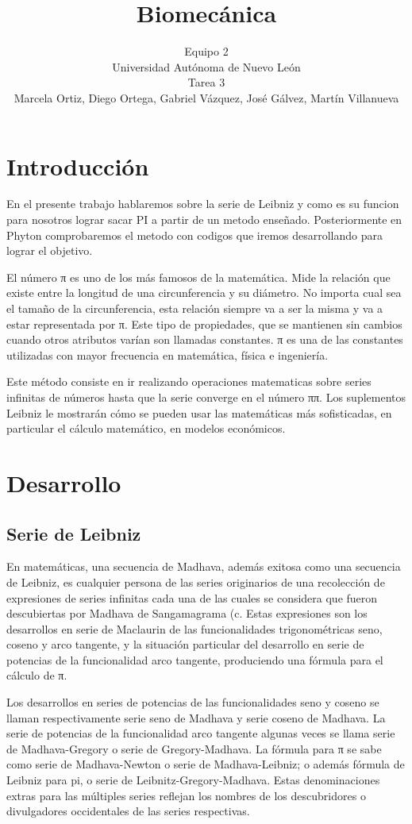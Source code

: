 \documentclass[a4paper]{article}
\title{Biomecánica}
\author{Equipo 2\\
  \small Universidad Autónoma de Nuevo León\\
  \small Tarea 3\\
  \small Marcela Ortiz, Diego Ortega, Gabriel Vázquez, José Gálvez, Martín Villanueva\\
  \date{}
}
\begin{document}
\maketitle

\section{Introducci\'on}
En el presente trabajo hablaremos sobre la serie de Leibniz y como es su funcion para nosotros lograr sacar PI a partir de un metodo enseñado.  Posteriormente en Phyton comprobaremos el metodo con codigos que iremos desarrollando para lograr el objetivo. 

El número π es uno de los más famosos de la matemática. Mide la relación que existe entre la longitud de una circunferencia y su diámetro. No importa cual sea el tamaño de la circunferencia, esta relación siempre va a ser la misma y va a estar representada por π. Este tipo de propiedades, que se mantienen sin cambios cuando otros atributos varían son llamadas constantes. π es una de las constantes utilizadas con mayor frecuencia en matemática, física e ingeniería. 

Este método consiste en ir realizando operaciones matematicas sobre series infinitas de números hasta que la serie converge en el número ππ. Los suplementos Leibniz le mostrarán cómo se pueden usar las matemáticas más sofisticadas, en particular el cálculo matemático, en modelos económicos.  

\section{Desarrollo}
\subsection{Serie de Leibniz }

En matemáticas, una secuencia de Madhava, además exitosa como una secuencia de Leibniz, es cualquier persona de las series originarios de una recolección de expresiones de series infinitas cada una de las cuales se considera que fueron descubiertas por Madhava de Sangamagrama (c. Estas expresiones son los desarrollos en serie de Maclaurin de las funcionalidades trigonométricas seno, coseno y arco tangente, y la situación particular del desarrollo en serie de potencias de la funcionalidad arco tangente, produciendo una fórmula para el cálculo de π.  

Los desarrollos en series de potencias de las funcionalidades seno y coseno se llaman respectivamente serie seno de Madhava y serie coseno de Madhava. La serie de potencias de la funcionalidad arco tangente algunas veces se llama serie de Madhava-Gregory o serie de Gregory-Madhava. La fórmula para π se sabe como serie de Madhava-Newton o serie de Madhava-Leibniz; o además fórmula de Leibniz para pi, o serie de Leibnitz-Gregory-Madhava. Estas denominaciones extras para las múltiples series reflejan los nombres de los descubridores o divulgadores occidentales de las series respectivas.  
\end{document}
